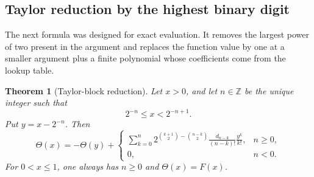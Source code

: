\documentclass[11pt,oneside]{article}
\newtheorem{theorem}{Theorem}[section]
\theoremstyle{definition}
\theoremstyle{remark}
\newcommand{\Z}{\mathbb Z}
\newcommand{\Thetaf}{\Theta}
\begin{document}
\subsection{Taylor reduction by the highest binary digit}

The next formula was designed for exact evaluation.  It removes the largest power
of two present in the argument and replaces the function value by one at a smaller
argument plus a finite polynomial whose coefficients come from the lookup table.

\begin{theorem}[Taylor-block reduction]\label{thm:Taylor-reduction}
Let $x>0$, and let $n\in\Z$ be the unique integer such that
\begin{equation}\label{eq:Taylor-cell}
  2^{-n}\le x<2^{-n+1}.
\end{equation}
Put $y=x-2^{-n}$.  Then
\begin{equation}\label{eq:Taylor-reduction}
 \Thetaf(x)=-\Thetaf(y)+
 \begin{cases}
 \displaystyle
 \sum_{k=0}^{n}
 2^{\binom{k+1}{2}-\binom{n-k}{2}}
 \frac{d_{n-k}}{(n-k)!}\frac{y^k}{k!},& n\ge0,\\[3ex]
 0,&n<0.
 \end{cases}
\end{equation}
For $0<x\le1$, one always has $n\ge0$ and $\Thetaf(x)=F(x)$.
\end{theorem}
\end{document}
